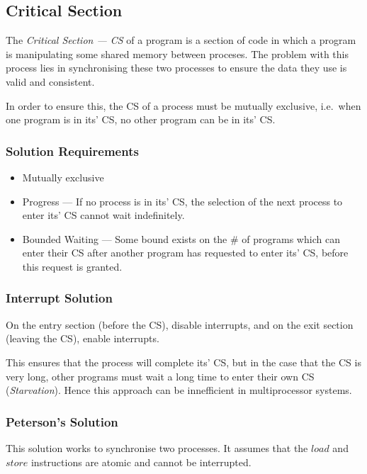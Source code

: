 \subsection{Critical Section}

The \textit{Critical Section --- CS} of a program is a section of code in which
a program is manipulating some shared memory between proceses. The problem with
this process lies in synchronising these two processes to ensure the data they
use is valid and consistent.

In order to ensure this, the CS of a process must be mutually exclusive, i.e.\ 
when one program is in its' CS, no other program can be in its' CS.


\subsubsection{Solution Requirements}

\begin{itemize}
    \item Mutually exclusive
    \item Progress --- If no process is in its' CS, the selection of the next process to enter its' CS cannot wait indefinitely.
    \item Bounded Waiting --- Some bound exists on the \# of programs which can enter their CS after another program has requested to enter its' CS, before this request is granted.
\end{itemize}


\subsubsection{Interrupt Solution}

On the entry section (before the CS), disable interrupts, and on the exit section (leaving the CS), enable interrupts.

This ensures that the process will complete its' CS, but in the case that the CS is very long, other programs must
wait a long time to enter their own CS (\textit{Starvation}). Hence this approach can be innefficient in multiprocessor
systems.

\subsubsection{Peterson's Solution}

This solution works to synchronise two processes. It assumes that the $load$ and $store$ instructions are atomic and cannot
be interrupted.

